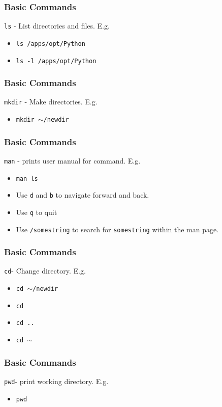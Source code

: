 \documentclass{beamer}
\newcommand{\code}[1]{\colorbox{codegray}{\texttt{#1}}}
\begin{document}
\begin{frame}
\frametitle{Basic Commands}
\code{ls} - List directories and files. E.g.
\bigskip
\begin{itemize}
    \item \code{ls /apps/opt/Python}
    \bigskip
    \pause
    \item \code{ls -l /apps/opt/Python} 
\end{itemize}
\end{frame}



\begin{frame}
\frametitle{Basic Commands}
\code{mkdir} - Make directories. E.g.
\bigskip
\begin{itemize}
    \item \code{mkdir $\sim$/newdir}
\end{itemize}
\end{frame}


\begin{frame}
\frametitle{Basic Commands}
\code{man} - prints user manual for command. E.g.
\bigskip
\begin{itemize}
    \item \code{man ls}
    \pause
    \bigskip
    \item Use \code{d} and \code{b} to navigate forward and back.
    \pause
    \bigskip
    \item Use \code{q} to quit
    \pause
    \bigskip
    \item Use \code{/somestring} to search for \code{somestring} within the man page.
\end{itemize}
\end{frame}


\begin{frame}
\frametitle{Basic Commands}
\code{cd}- Change directory. E.g.
\bigskip
\begin{itemize}
    \item \code{cd $\sim$/newdir}
    \pause
    \bigskip
    \item \code{cd}
    \pause
    \bigskip
    \item \code{cd ..}
    \pause
    \bigskip
    \item \code{cd $\sim$} 
\end{itemize}
\end{frame}


\begin{frame}
\frametitle{Basic Commands}
\code{pwd}- print working directory. E.g.
\bigskip
\begin{itemize}
    \item \code{pwd}
\end{itemize}
\end{frame}
\end{document}
